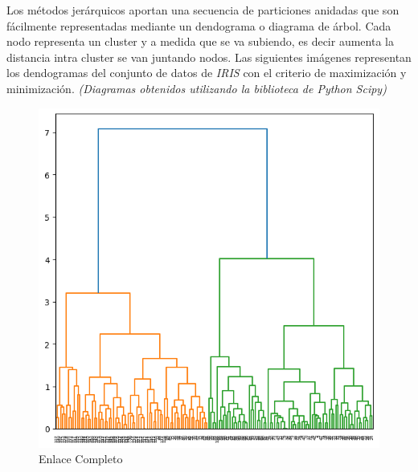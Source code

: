 \noindent Los métodos jerárquicos aportan una secuencia de particiones anidadas que son fácilmente representadas mediante un dendograma o diagrama de árbol. 
Cada nodo representa un cluster y a medida que se va subiendo, es decir aumenta la distancia intra cluster se van juntando nodos. Las siguientes imágenes representan los dendogramas del conjunto de datos de \emph{IRIS} \cite{Iris Fisher} con el criterio de maximización y minimización. \emph{(Diagramas obtenidos utilizando la biblioteca de Python Scipy)}

\begin{figure}[ht]
  \centering
  \begin{minipage}{0.45\textwidth}
    \centering
    \includegraphics[width=\textwidth]{Documentos Extra/Imagenes/complete_linkage.png}
    \caption{Enlace Completo}
    \label{fig:complete_linkage}
  \end{minipage}
  \hfill
  \begin{minipage}{0.45\textwidth}
    \centering

\end{minipage}
\end{figure}
